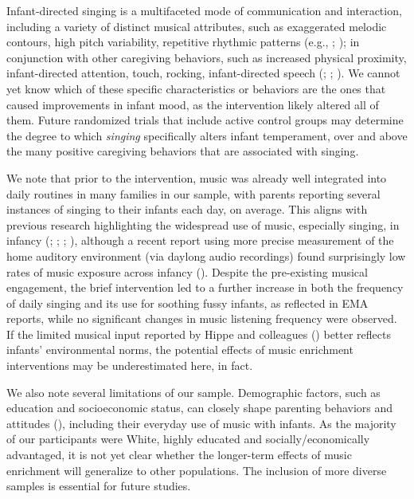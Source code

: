 \documentclass[
]{article}
\begin{document}
Infant-directed singing is a multifaceted mode of communication and
interaction, including a variety of distinct musical attributes, such as
exaggerated melodic contours, high pitch variability, repetitive
rhythmic patterns (e.g., ; ); in
conjunction with other caregiving behaviors, such as increased physical
proximity, infant-directed attention, touch, rocking, infant-directed
speech (;
;
). We cannot
yet know which of these specific characteristics or behaviors are the
ones that caused improvements in infant mood, as the intervention likely
altered all of them. Future randomized trials that include active
control groups may determine the degree to which \emph{singing}
specifically alters infant temperament, over and above the many positive
caregiving behaviors that are associated with singing.

We note that prior to the intervention, music was already well
integrated into daily routines in many families in our sample, with
parents reporting several instances of singing to their infants each
day, on average. This aligns with previous research highlighting the
widespread use of music, especially singing, in infancy
(;
;
;
), although a recent report using
more precise measurement of the home auditory environment (via daylong
audio recordings) found surprisingly low rates of music exposure across
infancy (). Despite the
pre-existing musical engagement, the brief intervention led to a further
increase in both the frequency of daily singing and its use for soothing
fussy infants, as reflected in EMA reports, while no significant changes
in music listening frequency were observed. If the limited musical input
reported by Hippe and colleagues () better
reflects infants' environmental norms, the potential effects of music
enrichment interventions may be underestimated here, in fact.

We also note several limitations of our sample. Demographic factors,
such as education and socioeconomic status, can closely shape parenting
behaviors and attitudes (), including their everyday use of music with infants. As the
majority of our participants were White, highly educated and
socially/economically advantaged, it is not yet clear whether the
longer-term effects of music enrichment will generalize to other
populations. The inclusion of more diverse samples is essential for
future studies.
\end{document}
